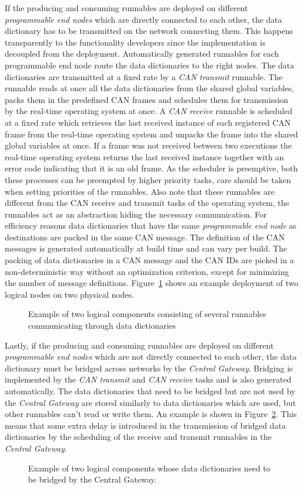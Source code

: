 If the producing and consuming runnables are deployed on different \textit{programmable end nodes} which are directly connected to each other, the data dictionary has to be transmitted on the network connecting them. This happens transparently to the functionality developers since the implementation is decoupled from the deployment. Automatically generated runnables for each programmable end node route the data dictionaries to the right nodes. The data dictionaries are transmitted at a fixed rate by a \textit{CAN transmit} runnable. The runnable reads at once all the data dictionaries from the shared global variables, packs them in the predefined CAN frames and schedules them for transmission by the real-time operating system at once. A \textit{CAN receive} runnable is scheduled at a fixed rate which retrieves the last received instance of each registered CAN frame from the real-time operating system and unpacks the frame into the shared global variables at once. If a frame was not received between two executions the real-time operating system returns the last received instance together with an error code indicating that it is an old frame. As the scheduler is preemptive, both these processes can be preempted by higher priority tasks, care should be taken when setting priorities of the runnables. Also note that these runnables are different from the CAN receive and transmit tasks of the operating system, the runnables act as an abstraction hiding the necessary communication. For efficiency reasons data dictionaries that have the same \textit{programmable end node} as destinations are packed in the same CAN message. The definition of the CAN messages is generated automatically at build time and can vary per build. The packing of data dictionaries in a CAN message and the CAN IDs are picked in a non-deterministic way without an optimization criterion, except for minimizing the number of message definitions. Figure~\ref{fig:physical_example} shows an example deployment of two logical nodes on two physical nodes.

\begin{figure}[htb]
    \centering
 \caption{Example of two logical components consisting of several runnables communicating through data dictionaries}
\label{fig:physical_example}
\end{figure}

Lastly, if the producing and consuming runnables are deployed on different \textit{programmable end nodes} which are not directly connected to each other, the data dictionary must be bridged across networks by the \textit{Central Gateway}. Bridging is implemented by the \textit{CAN transmit} and \textit{CAN receive} tasks and is also generated automatically. The data dictionaries that need to be bridged but are not used by the \textit{Central Gateway} are stored similarly to data dictionaries which are used, but other runnables can't read or write them. An example is shown in Figure~\ref{fig:bridging_example}. This means that some extra delay is introduced in the transmission of bridged data dictionaries by the scheduling of the receive and transmit runnables in the \textit{Central Gateway}.

\begin{figure}[htb]
    \centering
 \caption{Example of two logical components whose data dictionaries need to be bridged by the Central Gateway.}
\label{fig:bridging_example}
\end{figure}